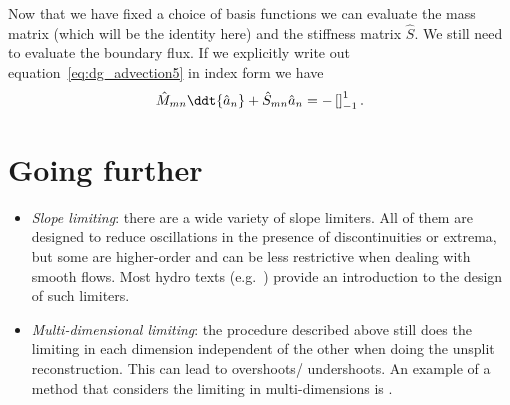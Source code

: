 Now that we have fixed a choice of basis functions we can evaluate the mass
matrix (which will be the identity here) and the stiffness matrix $\hat{S}$. We
still need to evaluate the boundary flux. If we explicitly write out equation~\ref{eq:dg_advection5}
in index form we have
%
\begin{equation}
  \label{eq:dg_advection6}
  \hat{M}_{mn} \ddt{\hat{a}_n} + \hat{S}_{mn} \hat{a}_n = -\left[  \right]_{-1}^1.
\end{equation}

\section{Going further}

\begin{itemize}

\item {\em Slope limiting}: there are a wide variety of slope
  limiters.  All of them are designed to reduce oscillations in the
  presence of discontinuities or extrema, but some are higher-order
  and can be less restrictive when dealing with smooth flows.  Most
  hydro texts (e.g.\ \cite{leveque:2002,toro:1997}) provide an
  introduction to the design of such limiters.

\item {\em Multi-dimensional limiting}: the procedure described above
  still does the limiting in each dimension independent of the other
  when doing the unsplit reconstruction.  This can lead to overshoots/
  undershoots.  An example of a method that considers the limiting
  in multi-dimensions is \cite{BDS,quadBDS}.


\end{itemize}

